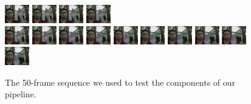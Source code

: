 \documentclass[12pt]{article}
\begin{document}
\begin{figure}[H]
\includegraphics[width=40px, height=30px]{../data/analysis/img0036.jpg}
\includegraphics[width=40px, height=30px]{../data/analysis/img0037.jpg}
\includegraphics[width=40px, height=30px]{../data/analysis/img0038.jpg}
\includegraphics[width=40px, height=30px]{../data/analysis/img0039.jpg} \\
\includegraphics[width=40px, height=30px]{../data/analysis/img0040.jpg}
\includegraphics[width=40px, height=30px]{../data/analysis/img0041.jpg}
\includegraphics[width=40px, height=30px]{../data/analysis/img0042.jpg}
\includegraphics[width=40px, height=30px]{../data/analysis/img0043.jpg}
\includegraphics[width=40px, height=30px]{../data/analysis/img0044.jpg}
\includegraphics[width=40px, height=30px]{../data/analysis/img0045.jpg}
\includegraphics[width=40px, height=30px]{../data/analysis/img0046.jpg}
\includegraphics[width=40px, height=30px]{../data/analysis/img0047.jpg}
\includegraphics[width=40px, height=30px]{../data/analysis/img0048.jpg}
\includegraphics[width=40px, height=30px]{../data/analysis/img0049.jpg}
\caption{The 50-frame sequence we used to test the components of our pipeline.}
\label{seq-original}
\end{figure}
\end{document}
